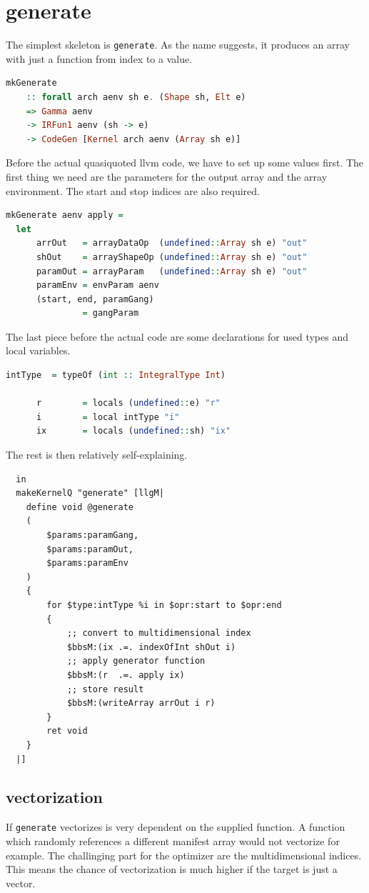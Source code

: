 \documentclass[a4paper,bibliography=totocnumbered,parskip,headsepline]{scrbook}
\begin{document}
\section{generate}
The simplest skeleton is \lstinline[language=haskell]!generate!.
As the name suggests, it produces an array with just a function from index to a value.
\begin{lstlisting}[language=haskell]
mkGenerate
    :: forall arch aenv sh e. (Shape sh, Elt e)
    => Gamma aenv
    -> IRFun1 aenv (sh -> e)
    -> CodeGen [Kernel arch aenv (Array sh e)]
\end{lstlisting}
Before the actual quasiquoted llvm code, we have to set up some values first.
The first thing we need are the parameters for the output array and the array environment.
The start and stop indices are also required.
\begin{lstlisting}[language=haskell]
mkGenerate aenv apply =
  let
      arrOut   = arrayDataOp  (undefined::Array sh e) "out"
      shOut    = arrayShapeOp (undefined::Array sh e) "out"
      paramOut = arrayParam   (undefined::Array sh e) "out"
      paramEnv = envParam aenv
      (start, end, paramGang)
               = gangParam
\end{lstlisting}
The last piece before the actual code are some declarations for used types and local variables.
\begin{lstlisting}[language=haskell]
      intType  = typeOf (int :: IntegralType Int)

      r        = locals (undefined::e) "r"
      i        = local intType "i"
      ix       = locals (undefined::sh) "ix"
\end{lstlisting}
The rest is then relatively self-explaining.
\begin{lstlisting}
  in
  makeKernelQ "generate" [llgM|
    define void @generate
    (
        $params:paramGang,
        $params:paramOut,
        $params:paramEnv
    )
    {
        for $type:intType %i in $opr:start to $opr:end
        {
            ;; convert to multidimensional index
            $bbsM:(ix .=. indexOfInt shOut i)
            ;; apply generator function
            $bbsM:(r  .=. apply ix)
            ;; store result
            $bbsM:(writeArray arrOut i r)
        }
        ret void
    }
  |]
\end{lstlisting}
\subsection*{vectorization}
If \lstinline[language=haskell]!generate! vectorizes is very dependent on the supplied function.
A function which randomly references a different manifest array would not vectorize for example.
The challinging part for the optimizer are the multidimensional indices.
This means the chance of vectorization is much higher if the target is just a vector.
\end{document}
